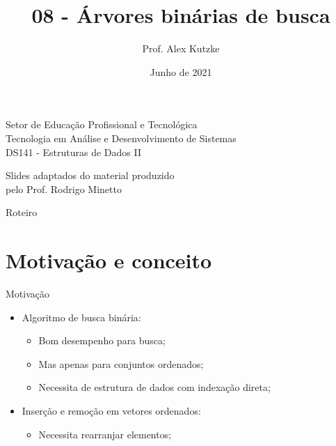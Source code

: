 \documentclass{beamer}
\title{08 - Árvores binárias de busca}
\author{Prof. Alex Kutzke}
\date{Junho de 2021}
\begin{document}
\begin{frame}
  \begin{center}
    \large{Setor de Educação Profissional e Tecnológica}\\
    Tecnologia em Análise e Desenvolvimento de Sistemas\\
    \vspace{1cm}			
    \small{DS141 - Estruturas de Dados II}
  \end{center}
  \titlepage

  \begin{center}
    Slides adaptados do material produzido\\pelo Prof. Rodrigo Minetto
  \end{center}
\end{frame}

\begin{frame}[c]{Roteiro}
  \tableofcontents

\end{frame}

\section{Motivação e conceito}

\begin{frame}[c]{Motivação}
  \begin{itemize}
    \item Algoritmo de busca binária:
    \begin{itemize}
      \item Bom desempenho para busca;
      \item Mas apenas para conjuntos ordenados;
      \item Necessita de estrutura de dados com indexação direta;
    \end{itemize}
    \item Inserção e remoção em vetores ordenados:
      \begin{itemize}
        \item Necessita rearranjar elementos;
      \end{itemize}
  \end{itemize}
\end{frame}
\end{document}
